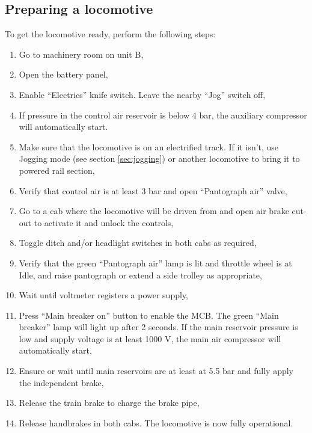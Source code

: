 \documentclass[11pt, a4paper]{article}
\begin{document}
\subsection{Preparing a locomotive}
To get the locomotive ready, perform the following steps:
\begin{enumerate}
\item Go to machinery room on unit B,
\item Open the battery panel,
\item Enable ``Electrics'' knife switch. Leave the nearby ``Jog'' switch off,
\item If pressure in the control air reservoir is below 4 bar, the auxiliary compressor will automatically start.
\item Make sure that the locomotive is on an electrified track. If it isn't, use Jogging mode (see section \ref{sec:jogging}) or another locomotive to bring it to powered rail section,
\item Verify that control air is at least 3 bar and open ``Pantograph air'' valve,
\item Go to a cab where the locomotive will be driven from and open air brake cut-out to activate it and unlock the controls,
\item Toggle ditch and/or headlight switches in both cabs as required,
\item Verify that the green ``Pantograph air'' lamp is lit and throttle wheel is at Idle, and raise pantograph or extend a side trolley as appropriate,
\item Wait until voltmeter registers a power supply,
\item Press ``Main breaker on'' button to enable the MCB. The green ``Main breaker'' lamp will light up after 2 seconds. If the main reservoir pressure is low and supply voltage is at least 1000 V, the main air compressor will automatically start,
\item Ensure or wait until main reservoirs are at least at 5.5 bar and fully apply the independent brake,
\item Release the train brake to charge the brake pipe,
\item Release handbrakes in both cabs. The locomotive is now fully operational.
\end{enumerate}
\end{document}
